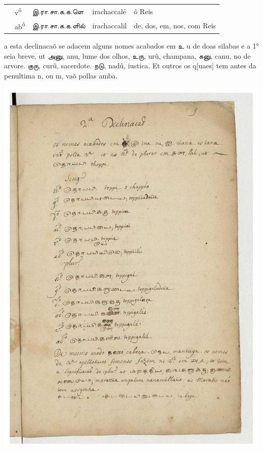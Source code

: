 \documentclass[12pt,a4paper]{scrbook}
\begin{document}
\begin{tabular}{lllll}
        
    
        
           &
          v\textsuperscript{õ} &
          இ.ரா.சா.க.க.ளெ &
          irachaccalé &
          ô Reis \\
    
        
    
        
           &
          ab\textsuperscript{õ} &
          இ.ரா.சா.க.க.ளில் &
          irachaccalil  &
          de, dos, em, nos, com Reis \\
    
        
    
      
\end{tabular}
    
      

a esta declinacaõ se adacem alguns nomes acabados em உ u de doas silabas e a 1° seia breve, ut அனு, anu, lume dos olhos, உரு, urû, champana, கனு, canu, no de arvore. குரு, curû, sacerdote. நடு, nadû, iustica. Et outros os q[uaes] tem antes da penultima n, ou m, vaõ pollas amba.
      
\newpage
\hypertarget{img-27}{
    \includegraphics[width=\textwidth]{img-27}}
\newpage
\end{document}
